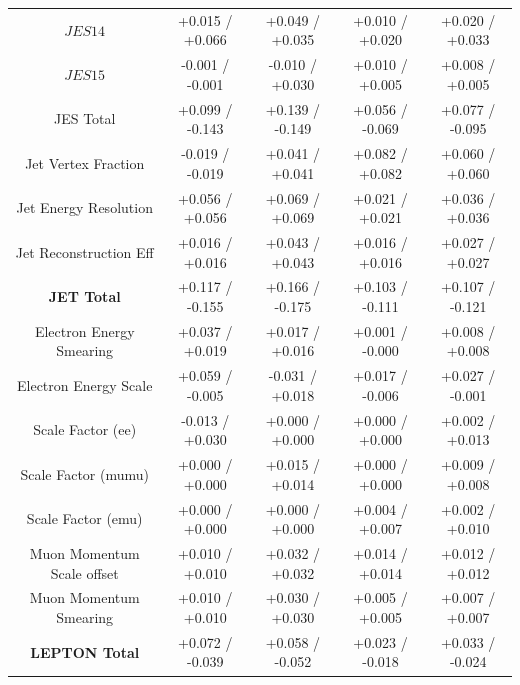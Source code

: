 \begin{table}[htbp]
\begin{center}
\begin{tabular}{|c|c|c|c|c|}
   $JES {14}$                          &  +0.015   / +0.066   & +0.049   / +0.035   & +0.010   / +0.020   & +0.020   / +0.033   \\
   $JES {15}$                          &  -0.001   / -0.001   & -0.010   / +0.030   & +0.010   / +0.005   & +0.008   / +0.005   \\
   \hline
   JES Total                             &  +0.099   / -0.143   & +0.139   / -0.149   & +0.056   / -0.069   & +0.077   / -0.095   \\
   Jet Vertex Fraction                   &  -0.019   / -0.019   & +0.041   / +0.041   & +0.082   / +0.082   & +0.060   / +0.060   \\
   Jet Energy Resolution                 &  +0.056   / +0.056   & +0.069   / +0.069   & +0.021   / +0.021   & +0.036   / +0.036   \\
   Jet Reconstruction Eff                &  +0.016   / +0.016   & +0.043   / +0.043   & +0.016   / +0.016   & +0.027   / +0.027   \\
   \hline
   \textbf{JET Total}                    &  +0.117   / -0.155   & +0.166   / -0.175   & +0.103   / -0.111   & +0.107   / -0.121   \\
   \hline
   Electron Energy Smearing              &  +0.037   / +0.019   & +0.017   / +0.016   & +0.001   / -0.000   & +0.008   / +0.008   \\
   Electron Energy Scale                 &  +0.059   / -0.005   & -0.031   / +0.018   & +0.017   / -0.006   & +0.027   / -0.001   \\
   Scale Factor (ee)                     &  -0.013   / +0.030   & +0.000   / +0.000   & +0.000   / +0.000   & +0.002   / +0.013   \\
   Scale Factor (mumu)                   &  +0.000   / +0.000   & +0.015   / +0.014   & +0.000   / +0.000   & +0.009   / +0.008   \\
   Scale Factor (emu)                    &  +0.000   / +0.000   & +0.000   / +0.000   & +0.004   / +0.007   & +0.002   / +0.010   \\
   Muon Momentum Scale offset            &  +0.010   / +0.010   & +0.032   / +0.032   & +0.014   / +0.014   & +0.012   / +0.012   \\
   Muon Momentum Smearing                &  +0.010   / +0.010   & +0.030   / +0.030   & +0.005   / +0.005   & +0.007   / +0.007   \\
   \hline
   \textbf{LEPTON Total}                 &  +0.072   / -0.039   & +0.058   / -0.052   & +0.023   / -0.018   & +0.033   / -0.024   \\

\end{tabular}
\end{center}
\end{table}
